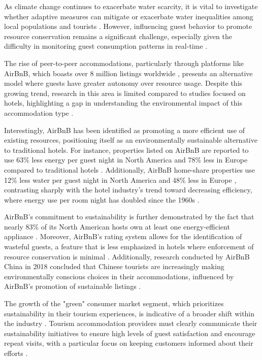 As climate change continues to exacerbate water scarcity, it is vital to investigate whether adaptive measures can 
mitigate or exacerbate water inequalities among local populations and tourists \cite{Ziervogel2010}. However, 
influencing guest behavior to promote resource conservation remains a significant challenge, especially given the 
difficulty in monitoring guest consumption patterns in real-time \cite{Juvan2014}.

The rise of peer-to-peer accommodations, particularly through platforms like AirBnB, which boasts over 8 million 
listings worldwide \cite{Airbnb2024a, Airbnb2024b}, presents an alternative model where guests have greater autonomy 
over resource usage. Despite this growing trend, research in this area is limited compared to studies focused on hotels, 
highlighting a gap in understanding the environmental impact of this accommodation type \cite{Becken2016, Warren2017}. 

Interestingly, AirBnB has been identified as promoting a more efficient use of existing resources, positioning itself 
as an environmentally sustainable alternative to traditional hotels. For instance, properties listed on AirBnB are 
reported to use 63\% less energy per guest night in North America and 78\% less in Europe compared to traditional hotels 
\cite{Simon2014}. Additionally, AirBnB home-share properties use 12\% less water per guest night in North America and 
48\% less in Europe \cite{Simon2014}, contrasting sharply with the hotel industry's trend toward decreasing efficiency, 
where energy use per room night has doubled since the 1960s \cite{Prairie2012}.

AirBnB's commitment to sustainability is further demonstrated by the fact that nearly 83\% of its North American hosts 
own at least one energy-efficient appliance \cite{Simon2014}. Moreover, AirBnB's rating system allows for the 
identification of wasteful guests, a feature that is less emphasized in hotels where enforcement of resource 
conservation is minimal \cite{Webb2014}. Additionally, research conducted by AirBnB China in 2018 concluded that Chinese 
tourists are increasingly making environmentally conscious choices in their accommodations, influenced by AirBnB's 
promotion of sustainable listings \cite{Airbnb2018}.

The growth of the "green" consumer market segment, which prioritizes sustainability in their tourism experiences, is 
indicative of a broader shift within the industry \cite{Weaver2005}. Tourism accommodation providers must clearly 
communicate their sustainability initiatives to ensure high levels of guest satisfaction and encourage repeat visits, 
with a particular focus on keeping customers informed about their efforts \cite{Rahman2015, Jones2014}.

